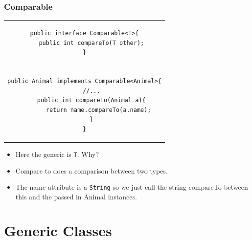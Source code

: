 \documentclass{beamer}
\begin{document}
\begin{frame}[fragile]
    \frametitle{Comparable}
    \centering
    \begin{center}
        \begin{tabular}{c}
            \begin{lstlisting}[basicstyle=\scriptsize]
public interface Comparable<T>{
    public int compareTo(T other);
}


public Animal implements Comparable<Animal>{
    //...
    public int compareTo(Animal a){
        return name.compareTo(a.name);
    }
}
            \end{lstlisting}
        \end{tabular}
    \end{center}
    \vfill
    \begin{itemize}
        \item Here the generic is \lstinline|T|. Why?
            
        \item Compare to does a comparison between two types.
            
        \item The name attribute is a \lstinline|String| so we just call the string compareTo between this and the passed in Animal instances.
    \end{itemize}
\end{frame}

\section{Generic Classes}
\end{document}
